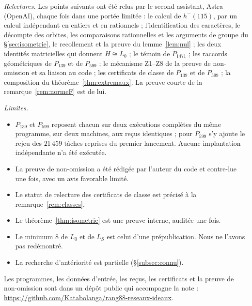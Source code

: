\documentclass[11pt,a4paper]{amsart}
\theoremstyle{plain}
\theoremstyle{definition}
\numberwithin{equation}{section}
\newcommand{\Lz}{L_{0}}
\newcommand{\LS}{L_{S}}
\begin{document}
\emph{Relectures.} Les points suivants ont été relus par le second assistant, Astra (OpenAI), chaque fois dans une portée limitée : le calcul de $h^-(115)$, par un calcul indépendant en entiers et en rationnels ; l'identification des caractères, le décompte des orbites, les comparaisons rationnelles et les arguments de groupe du \S\ref{sec:isometrie}, le recollement et la preuve du lemme~\ref{lem:nul} ; les deux identités matricielles qui donnent $H\cong\Lz$ ; le témoin de $P_{1471}$ ; les raccords géométriques de $P_{139}$ et de $P_{599}$ ; le mécanisme Z1--Z8 de la preuve de non-omission et sa liaison au code ; les certificats de classe de $P_{139}$ et de $P_{599}$ ; la composition du théorème~\ref{thm:extremaux}. La preuve courte de la remarque~\ref{rem:normeF} est de lui.

\emph{Limites.}
\begin{itemize}
\item $P_{139}$ et $P_{599}$ reposent chacun sur deux exécutions complètes du même programme, sur deux machines, aux reçus identiques ; pour $P_{599}$ s'y ajoute le rejeu des $21\,459$ tâches reprises du premier lancement. Aucune implantation indépendante n'a été exécutée.
\item La preuve de non-omission a été rédigée par l'auteur du code et contre-lue une fois, avec un avis favorable limité.
\item Le statut de relecture des certificats de classe est précisé à la remarque~\ref{rem:classes}.
\item Le théorème~\ref{thm:isometrie} est une preuve interne, auditée une fois.
\item Le minimum $8$ de $\Lz$ et de $\LS$ est celui d'une prépublication. Nous ne l'avons pas redémontré.
\item La recherche d'antériorité est partielle (\S\ref{subsec:connu}).
\end{itemize}

Les programmes, les données d'entrée, les reçus, les certificats et la preuve de non-omission sont dans un dépôt public qui accompagne la note : \url{https://github.com/Katabolanga/rang88-reseaux-ideaux}.
\end{document}

